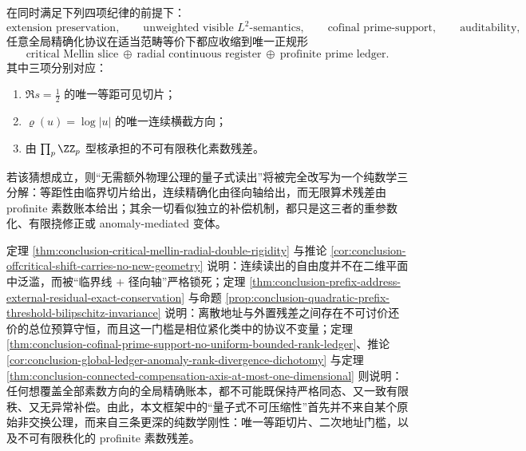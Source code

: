 \begin{conjecture}[全局精确化的正规形唯一性]\label{conj:conclusion-global-exactification-normal-form-uniqueness}
在同时满足下列四项纪律的前提下：
\[
\text{extension preservation},
\qquad
\text{unweighted visible \(L^2\)-semantics},
\qquad
\text{cofinal prime-support},
\qquad
\text{auditability},
\]
任意全局精确化协议在适当范畴等价下都应收缩到唯一正规形
\[
\boxed{
\text{critical Mellin slice}
\ \oplus\
\text{radial continuous register}
\ \oplus\
\text{profinite prime ledger}
}.
\]
其中三项分别对应：
\begin{enumerate}
  \item \(\Re s=\frac12\) 的唯一等距可见切片；
  \item \(\varrho(u)=\log|u|\) 的唯一连续横截方向；
  \item 由 \(\prod_p\ZZ_p\) 型核承担的不可有限秩化素数残差。
\end{enumerate}
若该猜想成立，则“无需额外物理公理的量子式读出”将被完全改写为一个纯数学三分解：等距性由临界切片给出，连续精确化由径向轴给出，而无限算术残差由 profinite 素数账本给出；其余一切看似独立的补偿机制，都只是这三者的重参数化、有限挠修正或 anomaly-mediated 变体。
\end{conjecture}

\begin{remark}[统一读法]\label{rem:conclusion-criticalslice-radial-prefix-prime-ledger-unification}
定理 \ref{thm:conclusion-critical-mellin-radial-double-rigidity} 与推论 \ref{cor:conclusion-offcritical-shift-carries-no-new-geometry} 说明：连续读出的自由度并不在二维平面中泛滥，而被“临界线 \(+\) 径向轴”严格锁死；定理 \ref{thm:conclusion-prefix-address-external-residual-exact-conservation} 与命题 \ref{prop:conclusion-quadratic-prefix-threshold-bilipschitz-invariance} 说明：离散地址与外置残差之间存在不可讨价还价的总位预算守恒，而且这一门槛是相位紧化类中的协议不变量；定理 \ref{thm:conclusion-cofinal-prime-support-no-uniform-bounded-rank-ledger}、推论 \ref{cor:conclusion-global-ledger-anomaly-rank-divergence-dichotomy} 与定理 \ref{thm:conclusion-connected-compensation-axis-at-most-one-dimensional} 则说明：任何想覆盖全部素数方向的全局精确账本，都不可能既保持严格同态、又一致有限秩、又无异常补偿。由此，本文框架中的“量子式不可压缩性”首先并不来自某个原始非交换公理，而来自三条更深的纯数学刚性：唯一等距切片、二次地址门槛，以及不可有限秩化的 profinite 素数残差。
\end{remark}

\endinput
